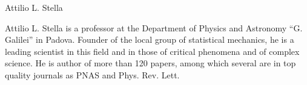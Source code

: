 \begin{participant}[type=PI,PM=8,gender=male,salary=11404.33]{Attilio L. Stella}

Attilio L. Stella is a professor at the Department of Physics and Astronomy ``G. Galilei'' in Padova. Founder of the local group of statistical mechanics, he is a leading scientist in this field and in those of critical phenomena and of complex science. He is author of more than 120 papers, among which several are in top quality journals as PNAS and Phys. Rev. Lett.

\end{participant}

